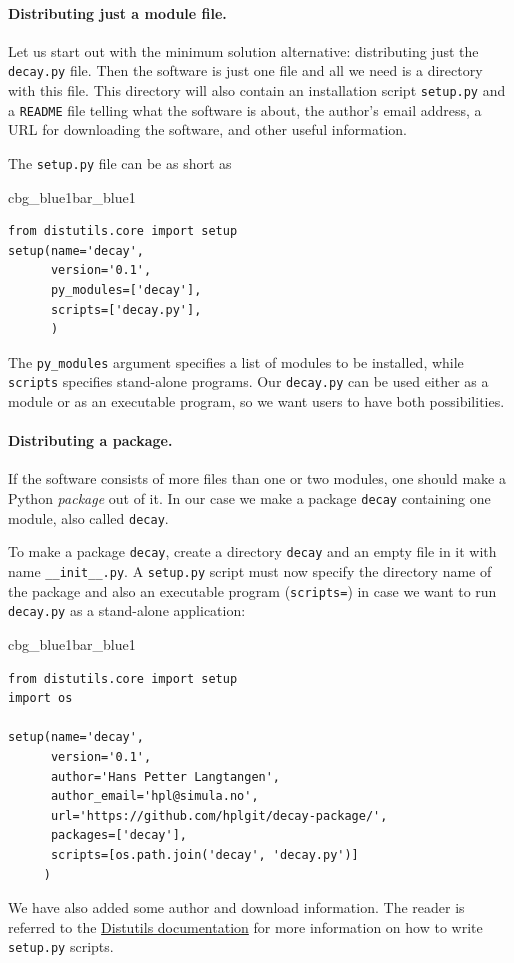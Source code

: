 \documentclass[%
oneside,                 %
final,                   %
10pt]{article}
\newenvironment{_pro_tight}[2]{
   \def\FrameCommand{\color{#2}\vrule width 1mm\normalcolor\colorbox{#1}}
   \FrameRule0.6pt\MakeFramed {\advance\hsize-2mm\FrameRestore}\vskip3mm}
   {\vskip0mm\endMakeFramed}
\newenvironment{pro}[2]{
\bgroup\rmfamily
\fboxsep=0mm\relax
\begin{_pro_tight}{#1}{#2}
\list{}{\parsep=-2mm\parskip=0mm\topsep=0pt\leftmargin=2mm
\rightmargin=2\leftmargin\leftmargin=4pt\relax}
\item\relax}
{\endlist\end{_pro_tight}\egroup}
\begin{document}
\paragraph{Distributing just a module file.}
Let us start out with the minimum solution alternative: distributing
just the \texttt{decay.py} file. Then the software is just one file and all
we need is a directory with this file. This directory will also
contain an installation script \texttt{setup.py} and a \texttt{README} file
telling what the software is about, the author's email address, a URL
for downloading the software, and other useful information.


The \texttt{setup.py} file can be as short as

\begin{pro}{cbg_blue1}{bar_blue1}\begin{Verbatim}[numbers=none,fontsize=\fontsize{9pt}{9pt},baselinestretch=0.95,xleftmargin=2mm]
from distutils.core import setup
setup(name='decay',
      version='0.1',
      py_modules=['decay'],
      scripts=['decay.py'],
      )
\end{Verbatim}
\end{pro}
\noindent
The \Verb!py_modules! argument specifies a list of modules to be installed, while
\texttt{scripts} specifies stand-alone programs. Our \texttt{decay.py} can be used
either as a module or as an executable program, so we want users to
have both possibilities.


\paragraph{Distributing a package.}
If the software consists of more files than one or two modules, one
should make a Python \emph{package} out of it. In our case we make a
package \texttt{decay} containing one module, also called \texttt{decay}.

To make a package \texttt{decay}, create a directory \texttt{decay} and an empty
file in it with name \Verb!__init__.py!.
A \texttt{setup.py} script must now specify the directory name of the package
and also an executable program (\texttt{scripts=})
in case we want to run \texttt{decay.py} as a stand-alone application:

\begin{pro}{cbg_blue1}{bar_blue1}\begin{Verbatim}[numbers=none,fontsize=\fontsize{9pt}{9pt},baselinestretch=0.95,xleftmargin=2mm]
from distutils.core import setup
import os

setup(name='decay',
      version='0.1',
      author='Hans Petter Langtangen',
      author_email='hpl@simula.no',
      url='https://github.com/hplgit/decay-package/',
      packages=['decay'],
      scripts=[os.path.join('decay', 'decay.py')]
     )
\end{Verbatim}
\end{pro}
\noindent
We have also added some author and download information.
The reader is referred to the \href{{https://docs.python.org/2/distutils/setupscript.html}}{Distutils documentation} for more information on how to
write \texttt{setup.py} scripts.
\end{document}
